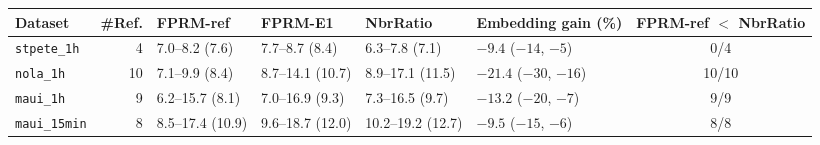\begin{tabular}{lrllllc}
\toprule
Dataset & \#Ref. & FPRM-ref & FPRM-E1 & NbrRatio & Embedding gain (\%) & FPRM-ref $<$ NbrRatio \\
\midrule
\texttt{stpete\_1h} & 4 & 7.0--8.2 (7.6) & 7.7--8.7 (8.4) & 6.3--7.8 (7.1) & $-9.4$ ($-14$, $-5$) & 0/4 \\
\texttt{nola\_1h} & 10 & 7.1--9.9 (8.4) & 8.7--14.1 (10.7) & 8.9--17.1 (11.5) & $-21.4$ ($-30$, $-16$) & 10/10 \\
\texttt{maui\_1h} & 9 & 6.2--15.7 (8.1) & 7.0--16.9 (9.3) & 7.3--16.5 (9.7) & $-13.2$ ($-20$, $-7$) & 9/9 \\
\texttt{maui\_15min} & 8 & 8.5--17.4 (10.9) & 9.6--18.7 (12.0) & 10.2--19.2 (12.7) & $-9.5$ ($-15$, $-6$) & 8/8 \\
\bottomrule
\end{tabular}

